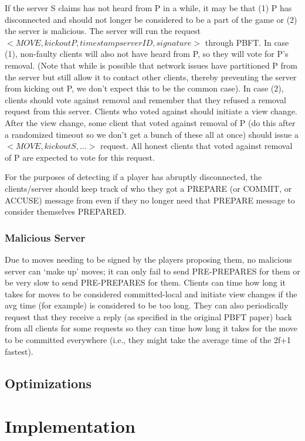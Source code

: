 \documentclass[11pt]{article}
\begin{document}
\begin{multicols}{2}
If the server S claims has not heard from P in a while, it may be that (1) P has disconnected and should not longer be considered to be a part of the game or (2) the server is malicious. The server will run the request $<MOVE, kick out P, timestamp serverID, signature>$ through PBFT. In case (1), non-faulty clients will also not have heard from P, so they will vote for P’s removal. (Note that while is possible that network issues have partitioned P from the server but still allow it to contact other clients, thereby preventing the server from kicking out P, we don’t expect this to be the common case). In case (2), clients should vote against removal and remember that they refused a removal request from this server. Clients who voted against should initiate a view change. After the view change, some client that voted against removal of P (do this after a randomized timeout so we don’t get a bunch of these all at once) should issue a $<MOVE, kick out S, ...>$ request. All honest clients that voted against removal of P are expected to vote for this request.

For the purposes of detecting if a player has abruptly disconnected, the clients/server should keep track of who they got a PREPARE (or COMMIT, or ACCUSE) message from even if they no longer need that PREPARE message to consider themselves PREPARED. 

\subsubsection{Malicious Server}

Due to moves needing to be signed by the players proposing them, no malicious server can ‘make up’ moves; it can only fail to send PRE-PREPARES for them or be very slow to send PRE-PREPARES for them. Clients can time how long it takes for moves to be considered committed-local and initiate view changes if the avg time (for example) is considered to be too long. They can also periodically request that they receive a reply (as specified in the original PBFT paper) back from all clients for some requests so they can time how long it takes for the move to be committed everywhere (i.e., they might take the average time of the 2f+1 fastest).  

\subsection{Optimizations}

\section{Implementation}


\end{multicols}
\end{document}
